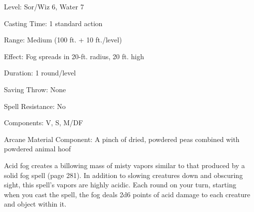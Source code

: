 \begin{description*}
\item[Level:] Sor/Wiz 6, Water 7
\item[Casting Time:] 1 standard action
\item[Range:] Medium (100 ft. + 10 ft./level)
\item[Effect:] Fog spreads in 20-ft. radius, 20 ft. high
\item[Duration:] 1 round/level
\item[Saving Throw:] None
\item[Spell Resistance:] No
\item[Components:] V, S, M/DF
\item[Arcane Material Component:] A pinch of dried, powdered peas combined with powdered animal hoof
\end{description*}

Acid fog creates a billowing mass of misty vapors similar to that produced by a solid fog spell (page 281). In addition to slowing creatures down and obscuring sight, this spell’s vapors are highly acidic. Each round on your turn, starting when you cast the spell, the fog deals 2d6 points of acid damage to each creature and object within it.